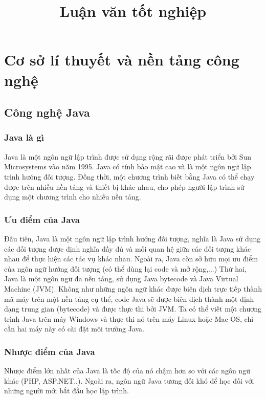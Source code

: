 \documentclass{article}
\title{Luận văn tốt nghiệp}
\begin{document}
\maketitle

\section{Cơ sở lí thuyết và nền tảng công nghệ}
\subsection{Công nghệ Java }
\subsubsection{Java là gì}
Java là một ngôn ngữ lập trình được sử dụng rộng rãi được phát triển bởi Sun Microsystems vào năm 1995. Java có tính bảo mật cao và là một ngôn ngữ lập trình hướng đối
tượng. Đồng thời, một chương trình biết bằng Java có thể chạy được trên nhiều nền tảng và thiết bị khác nhau, cho phép người lập trình sử dụng một chương trình cho nhiều
nền tảng.

\subsubsection{Ưu điểm của Java}
Đầu tiên, Java là một ngôn ngữ lập trình hướng đối tượng, nghĩa là Java sử dụng các đối tượng được định nghĩa đầy đủ và mối quan hệ giữa các đối tượng khác nhau để thực
hiện các tác vụ khác nhau. Ngoài ra, Java còn sở hữu mọi ưu điểm của ngôn ngữ hướng đối tượng (có thể dùng lại code và mở rộng,...)
Thứ hai, Java là một ngôn ngữ đa nền tảng, sử dụng Java bytecode và Java Virtual Machine (JVM). Không như những ngôn ngữ khác được biên dịch trực tiếp thành mã máy trên
một nền tảng cụ thể, code Java sẽ được biên dịch thành một định dạng trung gian (bytecode) và được thực thi bởi JVM. Ta có thể viết một chương trình Java trên máy Windows
và thực thi nó trên máy Linux hoặc Mac OS, chỉ cần hai máy này có cài đặt môi trường Java.
\subsubsection{Nhược điểm của Java}
Nhược điểm lớn nhất của Java là tốc độ của nó chậm hơn so với các ngôn ngữ khác (PHP, ASP.NET..). Ngoài ra, ngôn ngữ Java tương đối khó để học đối với những người mới bắt
đầu học lập trình.
\end{document}
